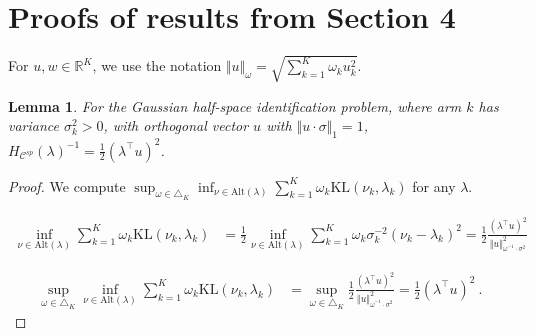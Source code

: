\documentclass{article}
\newcommand{\KL}{\mathrm{KL}}
\newcommand{\alt}{\mathrm{Alt}}
\newtheorem{lemma}{Lemma}
\begin{document}


\section{Proofs of results from Section 4}
\label{sec:proofs_of_results_from_section_sec:the_range_of_the_difficulty_ratio}

For $u, w \in \mathbb{R}^K$, we use the notation $\Vert u \Vert_{\omega} = \sqrt{\sum_{k=1}^K \omega_k u_k^2}$.

\begin{lemma}
For the Gaussian half-space identification problem, where arm $k$ has variance $\sigma_k^2 > 0$, with orthogonal vector $u$ with $\Vert u \cdot \sigma \Vert_1 = 1$, $H_{\mathcal C^{sp}}(\lambda)^{-1} = \frac{1}{2}(\lambda^\top u)^2$.
\end{lemma}

\begin{proof}
We compute $\sup_{\omega \in \triangle_K} \inf_{\nu \in \alt(\lambda)} \sum_{k=1}^K \omega_k \KL(\nu_k, \lambda_k)$ for any $\lambda$.

\begin{align*}
\inf_{\nu \in \alt(\lambda)} \sum_{k=1}^K \omega_k \KL(\nu_k, \lambda_k)
&= \frac{1}{2}\inf_{\nu \in \alt(\lambda)} \sum_{k=1}^K \omega_k \sigma_k^{-2} (\nu_k - \lambda_k)^2
= \frac{1}{2} \frac{(\lambda^\top u)^2}{\Vert u \Vert_{\omega^{-1} \cdot \sigma^{2}}^2}
\end{align*}

\begin{align*}
\sup_{\omega \in \triangle_K} \inf_{\nu \in \alt(\lambda)} \sum_{k=1}^K \omega_k \KL(\nu_k, \lambda_k)
&= \sup_{\omega \in \triangle_K} \frac{1}{2} \frac{(\lambda^\top u)^2}{\Vert u \Vert_{\omega^{-1} \cdot \sigma^{2}}^2}
= \frac{1}{2} (\lambda^\top u)^2
\: .
\end{align*}
\end{proof}
\end{document}

